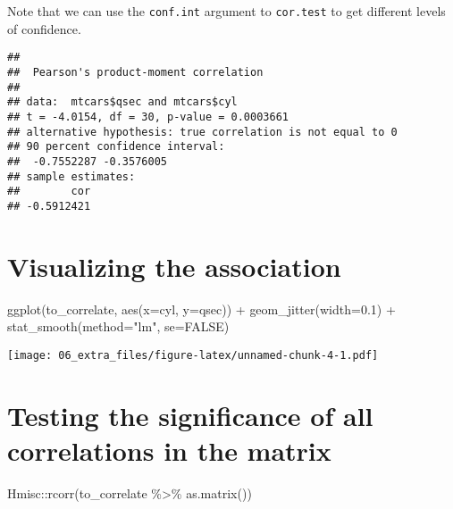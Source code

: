 \documentclass[
]{book}
\newenvironment{Shaded}{\begin{snugshade}}{\end{snugshade}}
\newcommand{\AttributeTok}[1]{\textcolor[rgb]{0.77,0.63,0.00}{#1}}
\newcommand{\ConstantTok}[1]{\textcolor[rgb]{0.00,0.00,0.00}{#1}}
\newcommand{\FloatTok}[1]{\textcolor[rgb]{0.00,0.00,0.81}{#1}}
\newcommand{\FunctionTok}[1]{\textcolor[rgb]{0.00,0.00,0.00}{#1}}
\newcommand{\NormalTok}[1]{#1}
\newcommand{\SpecialCharTok}[1]{\textcolor[rgb]{0.00,0.00,0.00}{#1}}
\newcommand{\StringTok}[1]{\textcolor[rgb]{0.31,0.60,0.02}{#1}}
\begin{document}
Note that we can use the \texttt{conf.int} argument to \texttt{cor.test} to get different levels of confidence.

\begin{Shaded}
\end{Shaded}

\begin{verbatim}
## 
##  Pearson's product-moment correlation
## 
## data:  mtcars$qsec and mtcars$cyl
## t = -4.0154, df = 30, p-value = 0.0003661
## alternative hypothesis: true correlation is not equal to 0
## 90 percent confidence interval:
##  -0.7552287 -0.3576005
## sample estimates:
##        cor 
## -0.5912421
\end{verbatim}

\hypertarget{visualizing-the-association}{%
\section{Visualizing the association}\label{visualizing-the-association}}

\begin{Shaded}
\begin{Highlighting}[]
\FunctionTok{ggplot}\NormalTok{(to\_correlate, }\FunctionTok{aes}\NormalTok{(}\AttributeTok{x=}\NormalTok{cyl, }\AttributeTok{y=}\NormalTok{qsec)) }\SpecialCharTok{+} \FunctionTok{geom\_jitter}\NormalTok{(}\AttributeTok{width=}\FloatTok{0.1}\NormalTok{) }\SpecialCharTok{+} \FunctionTok{stat\_smooth}\NormalTok{(}\AttributeTok{method=}\StringTok{"lm"}\NormalTok{, }\AttributeTok{se=}\ConstantTok{FALSE}\NormalTok{)}
\end{Highlighting}
\end{Shaded}

\texttt{[image: 06\_extra\_files/figure-latex/unnamed-chunk-4-1.pdf]}

\hypertarget{testing-the-significance-of-all-correlations-in-the-matrix}{%
\section{Testing the significance of all correlations in the matrix}\label{testing-the-significance-of-all-correlations-in-the-matrix}}

\begin{Shaded}
\begin{Highlighting}[]
\NormalTok{Hmisc}\SpecialCharTok{::}\FunctionTok{rcorr}\NormalTok{(to\_correlate }\SpecialCharTok{\%\textgreater{}\%} \FunctionTok{as.matrix}\NormalTok{())}
\end{Highlighting}
\end{Shaded}
\end{document}
